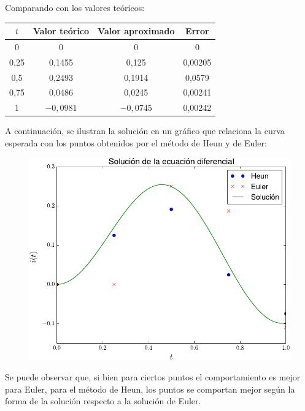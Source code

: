 \begin{questions}
    Comparando con los valores teóricos:
    \begin{table}[ht!]
        \centering
        \begin{tabular}{|c|c|c|c|}
            \hline$t$ & Valor teórico & Valor aproximado & Error   \\
            \hline 0  & 0             & 0                & 0       \\
            0,25      & 0,1455        & 0,125            & 0,00205 \\
            0,5       & 0,2493        & 0,1914           & 0,0579  \\
            0,75      & 0,0486        & 0,0245           & 0,00241 \\
            1         & $-0,0981$     & $-0,0745$        & 0,00242 \\
            \hline
        \end{tabular}
    \end{table}

    A continuación, se ilustran la solución en un gráfico que relaciona la curva esperada
    con los puntos obtenidos por el método de Heun y de Euler:
    \begin{figure}[ht!]
        \centering
        \includegraphics[width=.4\paperwidth]{solutionheun}
    \end{figure}
    Se puede observar que, si bien para ciertos puntos el comportamiento es mejor para Euler, para el
    método de Heun, los puntos se comportan mejor según la forma de la solución respecto a la solución
    de Euler.
\end{questions}

